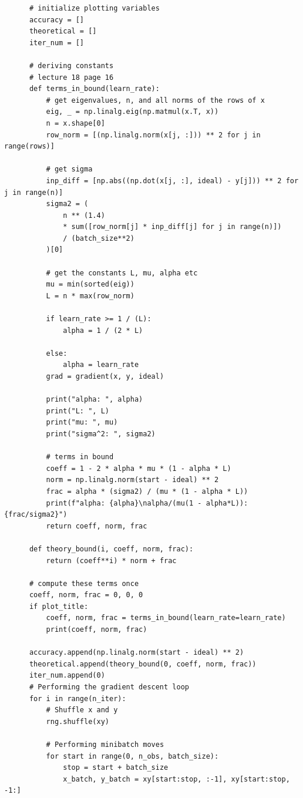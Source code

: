 \begin{verbatim}
      # initialize plotting variables
      accuracy = []
      theoretical = []
      iter_num = []

      # deriving constants
      # lecture 18 page 16
      def terms_in_bound(learn_rate):
          # get eigenvalues, n, and all norms of the rows of x
          eig, _ = np.linalg.eig(np.matmul(x.T, x))
          n = x.shape[0]
          row_norm = [(np.linalg.norm(x[j, :])) ** 2 for j in range(rows)]

          # get sigma
          inp_diff = [np.abs((np.dot(x[j, :], ideal) - y[j])) ** 2 for j in range(n)]
          sigma2 = (
              n ** (1.4)
              * sum([row_norm[j] * inp_diff[j] for j in range(n)])
              / (batch_size**2)
          )[0]

          # get the constants L, mu, alpha etc
          mu = min(sorted(eig))
          L = n * max(row_norm)

          if learn_rate >= 1 / (L):
              alpha = 1 / (2 * L)

          else:
              alpha = learn_rate
          grad = gradient(x, y, ideal)

          print("alpha: ", alpha)
          print("L: ", L)
          print("mu: ", mu)
          print("sigma^2: ", sigma2)

          # terms in bound
          coeff = 1 - 2 * alpha * mu * (1 - alpha * L)
          norm = np.linalg.norm(start - ideal) ** 2
          frac = alpha * (sigma2) / (mu * (1 - alpha * L))
          print(f"alpha: {alpha}\nalpha/(mu(1 - alpha*L)): {frac/sigma2}")
          return coeff, norm, frac

      def theory_bound(i, coeff, norm, frac):
          return (coeff**i) * norm + frac

      # compute these terms once
      coeff, norm, frac = 0, 0, 0
      if plot_title:
          coeff, norm, frac = terms_in_bound(learn_rate=learn_rate)
          print(coeff, norm, frac)

      accuracy.append(np.linalg.norm(start - ideal) ** 2)
      theoretical.append(theory_bound(0, coeff, norm, frac))
      iter_num.append(0)
      # Performing the gradient descent loop
      for i in range(n_iter):
          # Shuffle x and y
          rng.shuffle(xy)

          # Performing minibatch moves
          for start in range(0, n_obs, batch_size):
              stop = start + batch_size
              x_batch, y_batch = xy[start:stop, :-1], xy[start:stop, -1:]


\end{verbatim}
